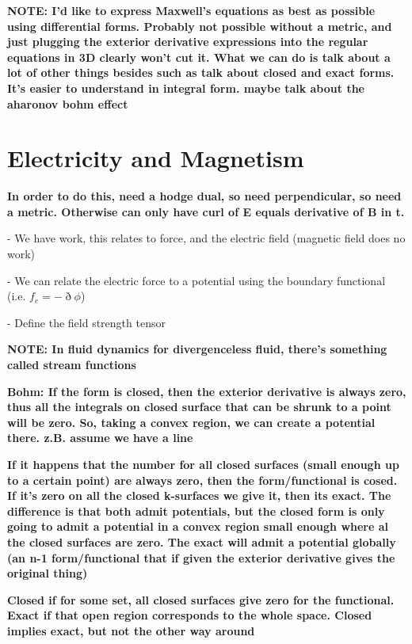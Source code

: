 \documentclass{book}
\begin{document}
\textbf{NOTE: I'd like to express Maxwell's equations as best as possible using differential forms. Probably not possible without a metric, and just plugging the exterior derivative expressions into the regular equations in 3D clearly won't cut it. What we can do is talk about a lot of other things besides such as talk about closed and exact forms. It's easier to understand in integral form. maybe talk about the aharonov bohm effect}

\section{Electricity and Magnetism}

\textbf{In order to do this, need a hodge dual, so need perpendicular, so need a metric. Otherwise can only have curl of E equals derivative of B in t. }

- We have work, this relates to force, and the electric field (magnetic field does no work)

- We can relate the electric force to a potential using the boundary functional (i.e. $f_e = -\eth\phi$)

- Define the field strength tensor


\textbf{NOTE: In fluid dynamics for divergenceless fluid, there's something called stream functions}

\textbf{Bohm: If the form is closed, then the exterior derivative is always zero, thus all the integrals on closed surface that can be shrunk to a point will be zero. So, taking a convex region, we can create a potential there. z.B. assume we have a line}

\textbf{If it happens that the number for all closed surfaces (small enough up to a certain point) are always zero, then the form/functional is cosed. If it's zero on all the closed k-surfaces we give it, then its exact. The difference is that both admit potentials, but the closed form is only going to admit a potential in a convex region small enough where al the closed surfaces are zero. The exact will admit a potential globally (an n-1 form/functional that if given the exterior derivative gives the original thing)}

\textbf{Closed if for some set, all closed surfaces give zero for the functional. Exact if that open region corresponds to the whole space. Closed implies exact, but not the other way around}
\end{document}
